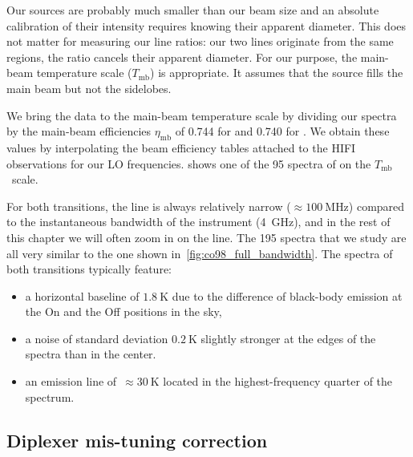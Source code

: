 Our sources are probably much smaller than our beam size and an absolute calibration of their intensity requires knowing their apparent diameter.
This does not matter for measuring our line ratios:
our two lines originate from the same regions, the ratio cancels their apparent diameter.
For our purpose, the main-beam temperature scale ($T_\text{mb}$) is appropriate.
It assumes that the source fills the main beam but not the sidelobes.

We bring the data to the main-beam temperature scale by dividing our spectra by the main-beam efficiencies $\eta_\text{mb}$ of
\num{0.744} for  and \num{0.740} for .
We obtain these values by interpolating the beam efficiency tables attached to the HIFI observations for our LO frequencies.
 shows one of the 95 spectra of  on the $T_\text{mb}$~scale.

For both transitions, the  line is always relatively narrow ($\approx \SI{100}{\mega\hertz}$) compared to the instantaneous bandwidth of the instrument (\SI{4}{\giga\hertz}), and in the rest of this chapter we will often zoom in on the line.
The 195 spectra that we study are all very similar to the one shown in~\cref{fig:co98_full_bandwidth}.
The spectra of both transitions typically feature:
\begin{itemize}[noitemsep,nolistsep]
    \item a horizontal baseline of $\SI{1.8}{\kelvin}$ due to the difference of black-body emission at the On and the Off positions in the sky,
    \item a noise of standard deviation $\SI{0.2}{\kelvin}$ slightly stronger at the edges of the spectra than in the center.
    \item an emission line of~$\approx \SI{30}{\kelvin}$ located in the highest-frequency quarter of the spectrum.
\end{itemize}




\subsection{Diplexer mis-tuning correction}

